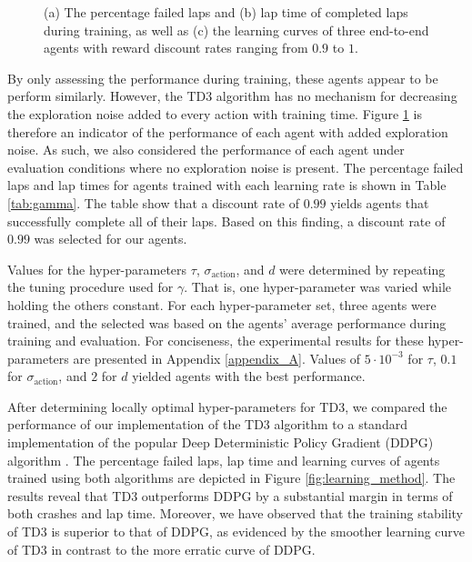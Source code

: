\begin{figure}[htb!]
    \centering
    
    \caption[Learning curves for tuning reward discount rate]{(a) The percentage failed laps and (b) lap time of completed laps during training, as well as (c) the learning curves of three end-to-end agents with reward discount rates ranging from $0.9$ to $1$.}
    \label{fig:gamma}
\end{figure}

By only assessing the performance during training, these agents appear to be perform similarly.
However, the TD3 algorithm has no mechanism for decreasing the exploration noise added to every action with training time.
Figure \ref{fig:gamma} is therefore an indicator of the performance of each agent with added exploration noise.
As such, we also considered the performance of each agent under evaluation conditions where no exploration noise is present.
The percentage failed laps and lap times for agents trained with each learning rate is shown in Table \ref{tab:gamma}.
The table show that a discount rate of $0.99$ yields agents that successfully complete all of their laps. 
Based on this finding, a discount rate of $0.99$ was selected for our agents.



Values for the hyper-parameters $\tau$, $\sigma_{\text{action}}$, and $d$ were determined by repeating the tuning procedure used for $\gamma$. 
That is, one hyper-parameter was varied while holding the others constant.
For each hyper-parameter set, three agents were trained, and the selected was based on the agents' average performance during training and evaluation. 
For conciseness, the experimental results for these hyper-parameters are presented in Appendix \ref{appendix_A}. 
Values of $5\cdot10^{-3}$ for $\tau$, $0.1$ for $\sigma_{\text{action}}$, and $2$ for $d$ yielded agents with the best performance.


After determining locally optimal hyper-parameters for TD3, we compared the performance of our implementation of the TD3 algorithm to a standard implementation of the popular Deep Deterministic Policy Gradient (DDPG) algorithm  \cite{Ivanov2020, Capo2020, Niu2020}.
The percentage failed laps, lap time and learning curves of agents trained using both algorithms are depicted in Figure \ref{fig:learning_method}.
The results reveal that TD3 outperforms DDPG by a substantial margin in terms of both crashes and lap time.
Moreover, we have observed that the training stability of TD3 is superior to that of DDPG, as evidenced by the smoother learning curve of TD3 in contrast to the more erratic curve of DDPG.

